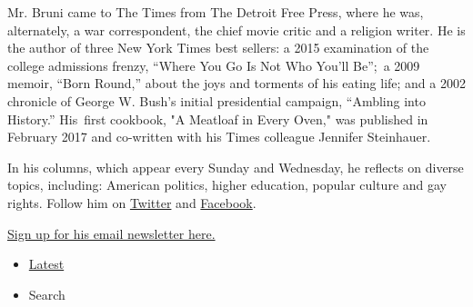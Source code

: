 Mr. Bruni came to The Times from The Detroit Free Press, where he was,
alternately, a war correspondent, the chief movie critic and a religion
writer. He is the author of three New York Times best sellers: a 2015
examination of the college admissions frenzy, ``Where You Go Is Not Who
You'll Be'';~a 2009 memoir, ``Born Round,'' about the joys and torments
of his eating life; and a 2002 chronicle of George W. Bush's initial
presidential campaign, ``Ambling into History.'' His~first cookbook, "A
Meatloaf in Every Oven," was published in February 2017 and co-written
with his Times colleague Jennifer Steinhauer.~

In his columns, which appear every Sunday and Wednesday, he reflects on
diverse topics, including: American politics, higher education, popular
culture and gay rights. Follow him on
\href{https://twitter.com/frankbruni}{Twitter} and
\href{https://www.facebook.com/frankbruninyt}{Facebook}.

\href{https://www.nytimes.com/newsletters/frank-bruni}{Sign up for his
email newsletter here.}

\begin{itemize}
\tightlist
\item
  \protect\hyperlink{stream-panel}{Latest}
\item
  Search
\end{itemize}

